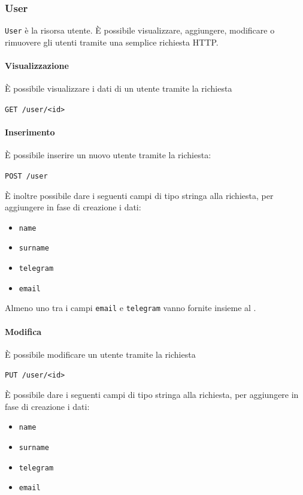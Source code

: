 \subsubsection{User}

\texttt{User} è la risorsa utente.
È possibile visualizzare, aggiungere, modificare o rimuovere gli utenti tramite una semplice
richiesta HTTP.

\paragraph{Visualizzazione}
È possibile visualizzare i dati di un utente tramite la richiesta
    \begin{center}
        \texttt{GET  /user/<id>}
    \end{center}

\paragraph{Inserimento}
È possibile inserire un nuovo utente tramite la richiesta:
    \begin{center}
        \texttt{POST /user}
    \end{center}

È inoltre possibile dare i seguenti campi di tipo stringa alla richiesta, per aggiungere in fase di creazione i dati:
\begin{itemize}[noitemsep]
    \item \texttt{name}
    \item \texttt{surname}
    \item \texttt{telegram}
    \item \texttt{email}
\end{itemize}
Almeno uno tra i campi \texttt{email} e \texttt{telegram} vanno fornite insieme al .

\paragraph{Modifica}

È possibile modificare un utente tramite la richiesta
\begin{center}
    \texttt{PUT /user/<id>}
\end{center}

È possibile dare i seguenti campi di tipo stringa alla richiesta, per aggiungere in fase di creazione i dati:
\begin{itemize}[noitemsep]
    \item \texttt{name}
    \item \texttt{surname}
    \item \texttt{telegram}
    \item \texttt{email}
\end{itemize}


